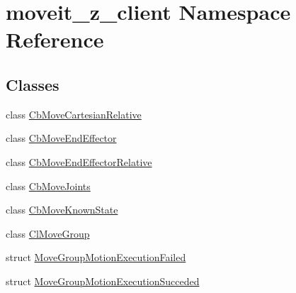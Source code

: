 \hypertarget{namespacemoveit__z__client}{}\section{moveit\+\_\+z\+\_\+client Namespace Reference}
\label{namespacemoveit__z__client}
\subsection*{Classes}
\begin{DoxyCompactItemize}
\item 
class \hyperlink{classmoveit__z__client_1_1CbMoveCartesianRelative}{Cb\+Move\+Cartesian\+Relative}
\item 
class \hyperlink{classmoveit__z__client_1_1CbMoveEndEffector}{Cb\+Move\+End\+Effector}
\item 
class \hyperlink{classmoveit__z__client_1_1CbMoveEndEffectorRelative}{Cb\+Move\+End\+Effector\+Relative}
\item 
class \hyperlink{classmoveit__z__client_1_1CbMoveJoints}{Cb\+Move\+Joints}
\item 
class \hyperlink{classmoveit__z__client_1_1CbMoveKnownState}{Cb\+Move\+Known\+State}
\item 
class \hyperlink{classmoveit__z__client_1_1ClMoveGroup}{Cl\+Move\+Group}
\item 
struct \hyperlink{structmoveit__z__client_1_1MoveGroupMotionExecutionFailed}{Move\+Group\+Motion\+Execution\+Failed}
\item 
struct \hyperlink{structmoveit__z__client_1_1MoveGroupMotionExecutionSucceded}{Move\+Group\+Motion\+Execution\+Succeded}
\end{DoxyCompactItemize}
